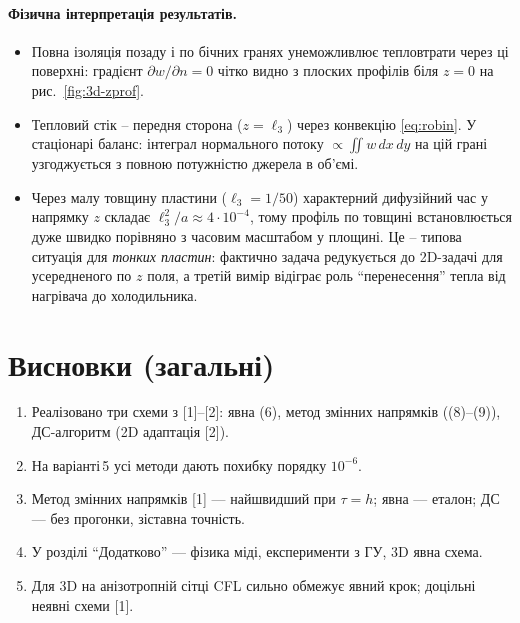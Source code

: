 \documentclass[12pt,a4paper]{article}
\newcommand{\tauh}{\tau}
\begin{document}
\paragraph{Фізична інтерпретація результатів.}
\begin{itemize}
  \item Повна ізоляція позаду і по бічних гранях унеможливлює тепловтрати через ці поверхні: градієнт $\partial w/\partial n = 0$ чітко видно з плоских профілів біля $z=0$ на рис.~\ref{fig:3d-zprof}.
  \item Тепловий стік -- передня сторона ($z=\ell_3$) через конвекцію \eqref{eq:robin}. У стаціонарі баланс: інтеграл нормального потоку $\propto \iint w\,dx\,dy$ на цій грані узгоджується з повною потужністю джерела в об'ємі.
  \item Через малу товщину пластини ($\ell_3 = 1/50$) характерний дифузійний час у напрямку $z$ складає $\ell_3^2/a \approx 4\cdot 10^{-4}$, тому профіль по товщині встановлюється дуже швидко порівняно з часовим масштабом у площині. Це -- типова ситуація для \emph{тонких пластин}: фактично задача редукується до 2D-задачі для усередненого по $z$ поля, а третій вимір відіграє роль ``перенесення'' тепла від нагрівача до холодильника.
\end{itemize}

\section*{Висновки (загальні)}

\begin{enumerate}
  \item Реалізовано три схеми з [1]--[2]: явна (6), метод змінних напрямків ((8)--(9)), ДС-алгоритм (2D адаптація [2]).
  \item На варіанті\,5 усі методи дають похибку порядку $10^{-6}$.
  \item Метод змінних напрямків [1] --- найшвидший при $\tauh=h$; явна --- еталон; ДС --- без прогонки, зіставна точність.
  \item У розділі ``Додатково'' --- фізика міді, експерименти з ГУ, 3D явна схема.
  \item Для 3D на анізотропній сітці CFL сильно обмежує явний крок; доцільні неявні схеми [1].
\end{enumerate}
\end{document}
